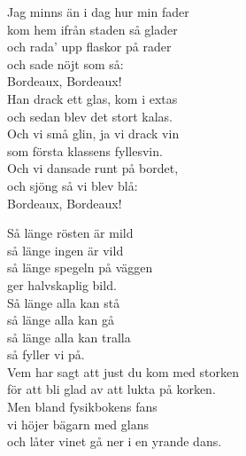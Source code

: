 \documentclass[a6paper, 10pt, twoside]{article}
\begin{document}
\noindent
\begin{center}
\end{center}
\begin{lyrics}
Jag minns än i dag hur min fader\\
kom hem ifrån staden så glader\\
och rada' upp flaskor på rader\\
och sade nöjt som så:\\
Bordeaux, Bordeaux!
\vspace{5pt}\\
Han drack ett glas, kom i extas\\
och sedan blev det stort kalas.\\
Och vi små glin, ja vi drack vin\\
som första klassens fyllesvin.\\
Och vi dansade runt på bordet,\\
och sjöng så vi blev blå:\\
Bordeaux, Bordeaux!
\end{lyrics}
\vspace{20pt}
\begin{center}
\end{center}
\begin{lyrics}
Så länge rösten är mild\\
så länge ingen är vild\\
så länge spegeln på väggen\\
ger halvskaplig bild.\\
Så länge alla kan stå\\
så länge alla kan gå\\
så länge alla kan tralla\\
så fyller vi på.
\vspace{5pt}\\
Vem har sagt att just du kom med storken\\
för att bli glad av att lukta på korken.\\
Men bland fysikbokens fans\\
vi höjer bägarn med glans\\
och låter vinet gå ner i en yrande dans.
\end{lyrics}
\end{document}
